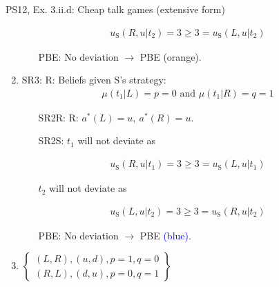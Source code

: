 \begin{frame}{PS12, Ex. 3.ii.d: Cheap talk games (extensive form)}
\begin{multicols}{2}
\begin{enumerate}
        \begin{align*}
          u_\text{S}(R,u|t_2)=3\geq3=u_\text{S}(L,u|t_2)
        \end{align*}\vspace{-18pt}
        \begin{itemize}\normalsize
          \item[PBE:] No deviation $\rightarrow$ PBE \textcolor{YellowOrange}{(orange)}.
        \end{itemize}
        \item SR3: R: Beliefs given S's strategy:\vspace{-8pt}
        \begin{align*}
          \mu(t_1|L)=p=0\text{ and }\mu(t_1|R)=q=1
        \end{align*}\vspace{-18pt}
        \begin{itemize}\normalsize
          \item[SR2R:] R: $a^*(L)=u,\ a^*(R)=u$.
          \item[SR2S:] $t_1$ will not deviate as
        \end{itemize}\vspace{-10pt}
        \begin{align*}
          u_\text{S}(R,u|t_1)=3\geq 3=u_\text{S}(L,u|t_1)
        \end{align*}\vspace{-18pt}
        \begin{itemize}\normalsize
          \item[] $t_2$ will not deviate as
        \end{itemize}\vspace{-10pt}
        \begin{align*}
          u_\text{S}(L,u|t_2)=3\geq3=u_\text{S}(R,u|t_2)
        \end{align*}\vspace{-18pt}
        \begin{itemize}\normalsize
          \item[PBE:] No deviation $\rightarrow$ PBE \textcolor{blue}{(blue)}.
        \end{itemize}
        \item $\left\{\begin{array}{c}
            (L,R),(u,d),p=1,q=0\\
            (R,L),(d,u),p=0,q=1\end{array}\right\}$
      \end{enumerate}
      \vfill\null
    \end{multicols}
\end{frame}
